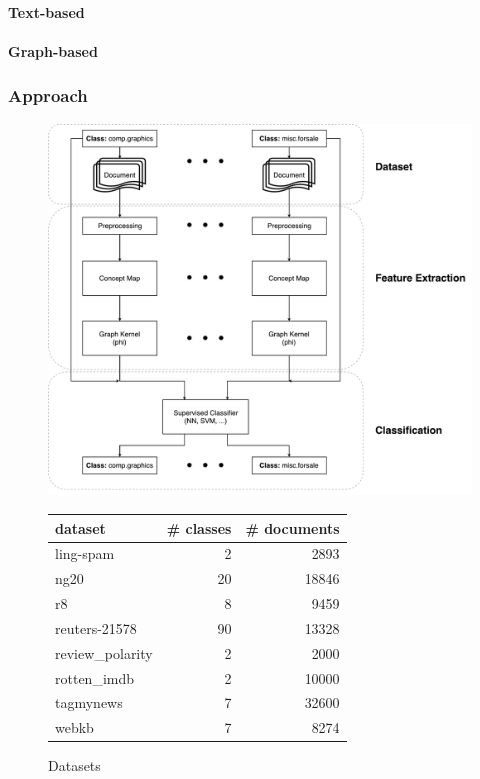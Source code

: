 \paragraph{Text-based}

\paragraph{Graph-based}
\todo{}

\subsubsection{Approach}

\begin{figure}[h]
\centering\includegraphics[width=0.6\linewidth]{assets/figures/approach.pdf}
\caption{}
\end{figure}


\begin{figure}
\centering
\begin{tabular}{lrr}

dataset &  \# classes &  \# documents \\
\midrule
ling-spam       &  2 &  2893 \\
ng20            &  20 &  18846 \\
r8              &  8 &  9459 \\
reuters-21578   &  90 &  13328 \\
review\_polarity &  2 &  2000 \\
rotten\_imdb     &  2 &  10000 \\
tagmynews       &  7 &  32600 \\
webkb           &  7 &  8274 \\

\end{tabular}

\caption{Datasets}
\end{figure}

